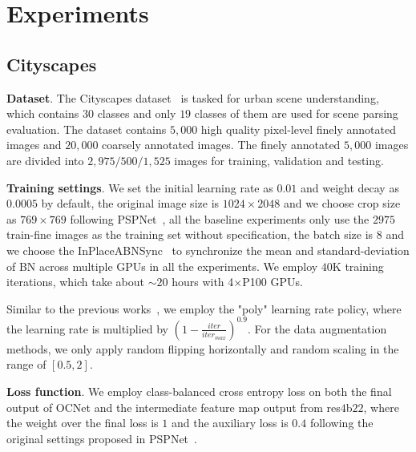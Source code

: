 \documentclass[10pt,twocolumn,letterpaper]{article}
\begin{document}
\section{Experiments}
\subsection{Cityscapes}

\noindent\textbf{Dataset}.
The Cityscapes dataset~\cite{cordts2016cityscapes} is tasked for urban scene understanding, which contains $30$ classes and only $19$ classes of them are used for scene parsing evaluation.
The dataset contains $5,000$ high quality pixel-level finely annotated images and $20,000$ coarsely annotated images. The finely annotated $5,000$ images are divided into $2,975/500/1,525$ images for training, validation and testing.

\vspace{0.1cm}
\noindent\textbf{Training settings}.
We set the initial learning rate as $0.01$ and weight decay as $0.0005$ by default, the original image size is $1024\times 2048$ and we choose crop size as $769\times 769$ following PSPNet~\cite{zhao2017pyramid}, all the baseline experiments only use the $2975$ train-fine images as the training set without specification, the batch size is 8 and we choose the InPlaceABNSync~\cite{Bul_2018_CVPR} to synchronize the mean and standard-deviation of BN across multiple GPUs in all the experiments.
We employ $40$K training iterations, which take about $\sim20$ hours with 4$\times$P100 GPUs.

Similar to the previous works~\cite{chen2017rethinking}, we employ the "poly" learning rate policy, where the learning rate is multiplied by $(1-\frac{iter}{iter_{max}})^{0.9}$.
For the data augmentation methods, we only apply random flipping horizontally and random scaling in the range of $[0.5, 2]$.

\vspace{0.1cm}
\noindent\textbf{Loss function}.
We employ class-balanced cross entropy loss on both the final output of OCNet and the intermediate feature map output from res$4$b$22$, where the weight over the final loss is $1$ and the auxiliary loss is $0.4$ following the original settings proposed in PSPNet~\cite{zhao2017pyramid}.
\end{document}

